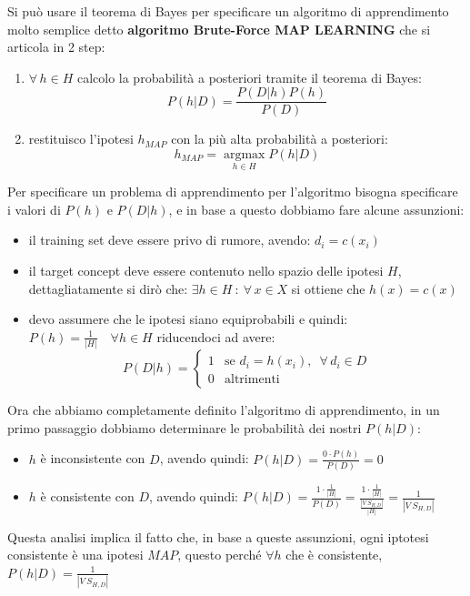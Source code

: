 Si può usare il teorema di Bayes per specificare un algoritmo di apprendimento molto semplice detto \textbf{algoritmo Brute-Force MAP LEARNING} che si articola
in 2 step:
\begin{enumerate}
  \item $\forall\,h\in H$ calcolo la probabilità a posteriori tramite il teorema di Bayes: \[P(h|D)=\frac{P(D|h)P(h)}{P(D)}\]
  \item restituisco l'ipotesi $h_{MAP}$ con la più alta probabilità a posteriori: \[h_{MAP}=\operatorname*{argmax}_{h\in H}P(h|D)\]
\end{enumerate}
Per specificare un problema di apprendimento per l'algoritmo bisogna specificare i valori di $P(h)$ e $P(D|h)$, e in base a questo dobbiamo fare alcune assunzioni:
\begin{itemize}
  \item il training set deve essere privo di rumore, avendo: $d_i=c(x_i)$
  \item il target concept deve essere contenuto nello spazio delle ipotesi $H$, dettagliatamente si dirò che: 
  $\exists h\in H \ : \  \forall\, x\in X$ si ottiene che $ h(x)=c(x)$
  \item devo assumere che le ipotesi siano equiprobabili e quindi: $P(h)=\displaystyle \frac{1}{|H|}\quad \forall h\in H$
  riducendoci ad avere:
  \[P(D|h)=
    \begin{cases}
      1&\mbox{se } d_i=h(x_ i),\,\,\,\forall\,d_i\in D\\
      0&\mbox{altrimenti}
    \end{cases}
  \]
\end{itemize}

Ora che abbiamo completamente definito l'algoritmo di apprendimento, in un primo passaggio dobbiamo determinare le probabilità dei nostri $P(h|D)$:
\begin{itemize}
   \item $h$ è inconsistente con $D$, avendo quindi: $P(h|D)=\displaystyle\frac{0\cdot P(h)}{P(D)}=0$
  \item $h$ è consistente con $D$, avendo quindi: $\displaystyle P(h|D)=\frac{1\cdot \frac{1}{|H|}}{P(D)} = \frac{1\cdot \frac{1}{|H|}}{\frac{|V\ S_{H,D}|}{|H|}}=\frac{1}{|V\ S_{H,D}|}$ 
\end{itemize}
Questa analisi implica il fatto che, in base a queste assunzioni, ogni iptotesi consistente è una ipotesi $MAP$, questo perché $\forall h$ che è consistente, $\displaystyle P(h|D) = \frac{1}{|V\ S_{H,D}|}$

